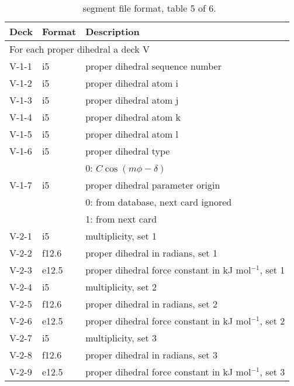\begin{table}[htbp]
\begin{center}
\begin{tabular*}{150mm}{p{15mm}p{12mm}l}
\hline\hline
Deck & Format & Description \\ \hline
\multicolumn{3}{l}{For each proper dihedral a deck V} \\
V-1-1 & i5     & proper dihedral sequence number \\
V-1-2 & i5     & proper dihedral atom i \\
V-1-3 & i5     & proper dihedral atom j \\
V-1-4 & i5     & proper dihedral atom k \\
V-1-5 & i5     & proper dihedral atom l \\
V-1-6 & i5     & proper dihedral type \\
      &        & 0: $C\cos(m\phi-\delta)$\\
V-1-7 & i5     & proper dihedral parameter origin\\
      &        & 0: from database, next card ignored \\
      &        & 1: from next card\\
V-2-1 & i5     & multiplicity, set 1\\
V-2-2 & f12.6  & proper dihedral in radians, set 1\\
V-2-3 & e12.5  & proper dihedral force constant in kJ mol$^{-1}$, set 1 \\
V-2-4 & i5     & multiplicity, set 2\\
V-2-5 & f12.6  & proper dihedral in radians, set 2\\
V-2-6 & e12.5  & proper dihedral force constant in kJ mol$^{-1}$, set 2 \\
V-2-7 & i5     & multiplicity, set 3\\
V-2-8 & f12.6  & proper dihedral in radians, set 3\\
V-2-9 & e12.5  & proper dihedral force constant in kJ mol$^{-1}$, set 3 \\
\hline
\end{tabular*}
\caption{\nwargos\ segment file format, table 5 of 6.\label{tbl:nwaseg5}}
\end{center}
\end{table}

